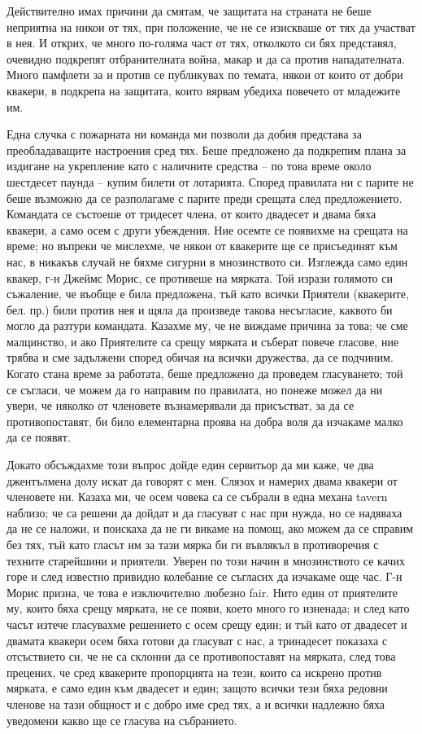 \documentclass[12pt]{book}
\begin{document}
Действително имах причини да смятам, че защитата на страната не беше неприятна на никои от тях, при положение, че не се изискваше от тях да участват в нея. И открих, че много по-голяма част от тях, отколкото си бях представял, очевидно подкрепят отбранителната война, макар и да са против нападателната. Много памфлети за и против се публикувах по темата, някои от които от добри квакери, в подкрепа на защитата, които вярвам убедиха повечето от младежите им.

Една случка с пожарната ни команда ми позволи да добия представа за преобладаващите настроения сред тях. Беше предложено да подкрепим плана за издигане на укрепление като с наличните средства – по това време около шестдесет паунда – купим билети от лотарията. Според правилата ни с парите не беше възможно да се разполагаме с парите преди срещата след предложението. Командата се състоеше от тридесет члена, от които двадесет и двама бяха квакери, а само осем с други убеждения. Ние осемте се появихме на срещата на време; но въпреки че мислехме, че някои от квакерите ще се присъединят към нас, в никакъв случай не бяхме сигурни в мнозинството си. Изглежда само един квакер, г-н Джеймс Морис, се противеше на мярката. Той изрази голямото си съжаление, че въобще е била предложена, тъй като всички Приятели (квакерите, бел. пр.) били против нея и щяла да произведе такова несъгласие, каквото би могло да разтури командата. Казахме му, че не виждаме причина за това; че сме малцинство, и ако Приятелите са срещу мярката и съберат повече гласове, ние трябва и сме задължени според обичая на всички дружества, да се подчиним. Когато стана време за работата, беше предложено да проведем гласуването; той се съгласи, че можем да го направим по правилата, но понеже можел да ни увери, че няколко от членовете възнамерявали да присъстват, за да се противопоставят, би било елементарна проява на добра воля да изчакаме малко да се появят. 

Докато обсъждахме този въпрос дойде един сервитьор да ми каже, че два джентълмена долу искат да говорят с мен. Слязох и намерих двама квакери от членовете ни. Казаха ми, че осем човека са се събрали в една механа tavern наблизо; че са решени да дойдат и да гласуват с нас при нужда, но се надяваха да не се наложи, и поискаха да не ги викаме на помощ, ако можем да се справим без тях, тъй като гласът им за тази мярка би ги въвлякъл в противоречия с техните старейшини и приятели. Уверен по този начин в мнозинството се качих горе и след известно привидно колебание се съгласих да изчакаме още час. Г-н Морис призна, че това е изключително любезно fair. Нито един от приятелите му, които бяха срещу мярката, не се появи, което много го изненада; и след като часът изтече гласувахме решението с осем срещу един; и тъй като от двадесет и двамата квакери осем бяха готови да гласуват с нас, а тринадесет показаха с отсъствието си, че не са склонни да се противопоставят на мярката, след това прецених, че сред квакерите пропорцията на тези, които са искрено против мярката, е само един към двадесет и един; защото всички тези бяха редовни членове на тази общност и с добро име сред тях, а и всички надлежно бяха уведомени какво ще се гласува на събранието. 
\end{document}

